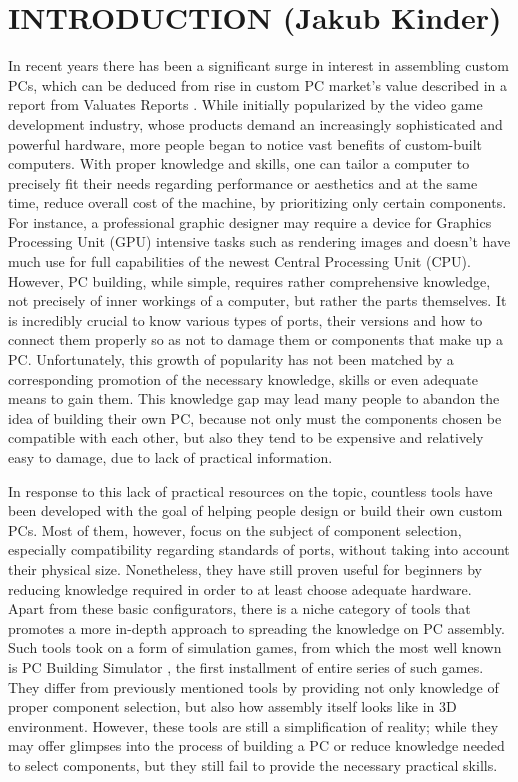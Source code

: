 \chapter{INTRODUCTION (Jakub Kinder)}
\label{chap:Introduction}

In recent years there has been a significant surge in interest in assembling custom PCs, which can be deduced from rise in custom PC market's value described in a report from Valuates Reports \cite{noauthor_global_2025}. 
While initially popularized by the video game development industry, whose products demand an increasingly sophisticated and powerful hardware, more people began to notice vast benefits of custom-built computers.
With proper knowledge and skills, one can tailor a computer to precisely fit their needs regarding performance or aesthetics and at the same time, reduce overall cost of the machine, by prioritizing only certain components.
For instance, a professional graphic designer may require a device for Graphics Processing Unit (GPU) intensive tasks such as rendering images and doesn't have much use for full capabilities of the newest Central Processing Unit (CPU).
However, PC building, while simple, requires rather comprehensive knowledge, not precisely of inner workings of a computer, but rather the parts themselves.
It is incredibly crucial to know various types of ports, their versions and how to connect them properly so as not to damage them or components that make up a PC.
Unfortunately, this growth of popularity has not been matched by a corresponding promotion of the necessary knowledge, skills or even adequate means to gain them.
This knowledge gap may lead many people to abandon the idea of building their own PC, because not only must the components chosen be compatible with each other, but also they tend to be expensive and relatively easy to damage, due to lack of practical information.

In response to this lack of practical resources on the topic, countless tools have been developed with the goal of helping people design or build their own custom PCs.
Most of them, however, focus on the subject of component selection, especially compatibility regarding standards of ports, without taking into account their physical size.
Nonetheless, they have still proven useful for beginners by reducing knowledge required in order to at least choose adequate hardware.
Apart from these basic configurators, there is a niche category of tools that promotes a more in-depth approach to spreading the knowledge on PC assembly.
Such tools took on a form of simulation games, from which the most well known is PC Building Simulator \cite{pcbuilder}, the first installment of entire series of such games.
They differ from previously mentioned tools by providing not only knowledge of proper component selection, but also how assembly itself looks like in 3D environment.
However, these tools are still a simplification of reality; while they may offer glimpses into the process of building a PC or reduce knowledge needed to select components, but they still fail to provide the necessary practical skills.

